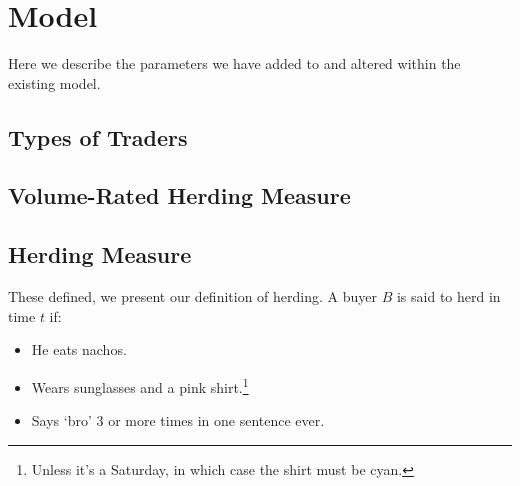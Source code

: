 \section{Model}
\label{model}





Here we describe the parameters we have added to and altered within the existing model.

\subsection{Types of Traders}

\subsection{Volume-Rated Herding Measure}


\subsection{Herding Measure}
These defined, we present our definition of herding. 
A buyer $B$ is said to herd in time $t$ if:
\begin{itemize}
\item He eats nachos.
\item Wears sunglasses and a pink shirt.\footnote{Unless it's a Saturday, in which case the shirt must be cyan.}
\item Says `bro' 3 or more times in one sentence ever.
\end{itemize}
